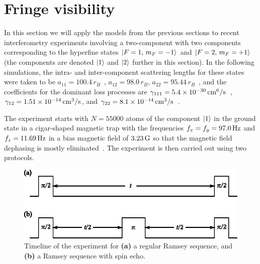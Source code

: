 \section{Fringe visibility}

In this section we will apply the models from the previous sections to recent interferometry experiments involving a two-component \Rb{}  with two components corresponding to the hyperfine states ${\mbox{\ensuremath{\left\vert F=1,\, m_F=-1 \right\rangle}}}$ and ${\mbox{\ensuremath{\left\vert F=2,\, m_F=+1 \right\rangle}}}$~\cite{Egorov2011} (the components are denoted $\mbox{\ensuremath{\left\vert 1 \right\rangle}}$ and $\mbox{\ensuremath{\left\vert 2 \right\rangle}}$ further in this section).
In the following simulations, the intra- and inter-component scattering lengths for these states were taken to be $a_{11} = 100.4\,r_B$~\cite{Widera2006,Mertes2007}, $a_{12} = 98.0\,r_B$, $a_{22} = 95.44\,r_B$~\cite{Egorov2013}, and the coefficients for the dominant loss processes are $\gamma_{111} = 5.4 \times 10^{-30} \mbox{\ensuremath{\,\mathrm{cm^6/s}}}$~\cite{Mertes2007}, $\gamma_{12} = 1.51 \times 10^{-14}\mbox{\ensuremath{\,\mathrm{cm^3/s}}}$, and $\gamma_{22} = 8.1 \times 10^{-14} \mbox{\ensuremath{\,\mathrm{cm^3/s}}}$~\cite{Egorov2013}.

The experiment starts with $N = 55000$ atoms of the component $\mbox{\ensuremath{\left\vert 1 \right\rangle}}$ in the ground state in a cigar-shaped magnetic trap with the frequencies $f_x = f_y = 97.0\mbox{\ensuremath{\,\mathrm{Hz}}}$ and $f_z = 11.69\mbox{\ensuremath{\,\mathrm{Hz}}}$ in a bias magnetic field of $3.23\mbox{\ensuremath{\,\mathrm{G}}}$ so that the magnetic field dephasing is mostly eliminated~\cite{Hall1998}.
The experiment is then carried out using two protocols.

\begin{figure}
    \centerline{\includegraphics{figures_precreated/sequences.eps}}
    \caption[Timeline of Ramsey and spin echo experimental sequences]{
    Timeline of the experiment for \textbf{(a)} a regular Ramsey sequence, and \textbf{(b)} a Ramsey sequence with spin echo.}%
    \label{fig:bec-noise:visibility:sequences}
\end{figure}

